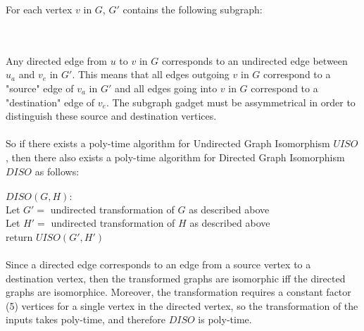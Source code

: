\documentclass[letterpaper,notitlepage,twoside]{article}
\newcommand\tab[1][1cm]{\hspace*{#1}} %
\begin{document}
For each vertex $v$ in $G$, $G'$ contains the following subgraph:\\
\\\\
Any directed edge from $u$ to $v$ in $G$ corresponds to an undirected edge between $u_a$ and $v_e$ in $G'$. This means that all edges outgoing $v$ in $G$ correspond to a "source" edge of $v_a$ in $G'$ and all edges going into $v$ in $G$ correspond to a "destination" edge of $v_e$. The subgraph gadget must be assymmetrical in order to distinguish these source and destination vertices.
\\\\
So if there exists a poly-time algorithm for Undirected Graph Isomorphism $UISO$, then there also exists a poly-time algorithm for Directed Graph Isomorphism $DISO$ as follows:
\\\\
$DISO(G, H):$\\
\tab Let $G' = $ undirected transformation of $G$ as described above\\
\tab Let $H' = $ undirected transformation of $H$ as described above\\
\tab return $UISO(G', H')$
\\\\
Since a directed edge corresponds to an edge from a source vertex to a destination vertex, then the transformed graphs are isomorphic iff the directed graphs are isomorphice. Moreover, the transformation requires a constant factor (5) vertices for a single vertex in the directed vertex, so the transformation of the inputs takes poly-time, and therefore $DISO$ is poly-time.
\end{document}
